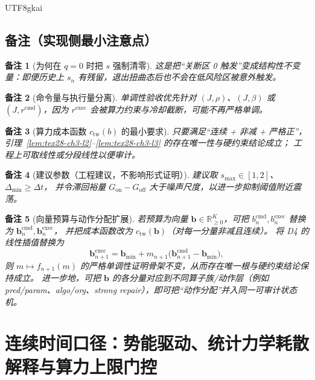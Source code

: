 \documentclass[12pt]{article}
\newtheorem{remark}{备注}[section]
\newcommand{\RR}{\mathbb{R}}
\begin{document}
\begin{CJK*}{UTF8}{gkai}
\subsection{备注（实现侧最小注意点）}
\label{subsec:tex28-ch3-remarks}

\begin{remark}[为何在 $q=0$ 时把 $s$ 强制清零]
这是把“关断区 0 触发”变成结构性不变量：即便历史上 $s_n$ 有残留，退出扭曲态后也不会在低风险区被意外触发。
\end{remark}

\begin{remark}[命令量与执行量分离]
单调性验收优先针对 $(J,\rho)$、$(J,\beta)$ 或 $(J,r^{\mathrm{cmd}})$，因为 $r^{\mathrm{exec}}$ 会被算力约束与冷却截断，可能不再严格单调。
\end{remark}

\begin{remark}[算力成本函数 $c_{\mathrm{tw}}(b)$ 的最小要求]
只要满足“连续 + 非减 + 严格正”，引理~\ref{lem:tex28-ch3-l2}--\ref{lem:tex28-ch3-l3} 的存在唯一性与硬约束结论成立；
工程上可取线性或分段线性以便审计。
\end{remark}

\begin{remark}[建议参数（工程建议，不影响形式证明）]
建议取 $s_{\max}\in[1,2]$、$\Delta_{\min}\ge\Delta t$，
并令滞回裕量 $G_{\mathrm{on}}-G_{\mathrm{off}}$ 大于噪声尺度，以进一步抑制阈值附近震荡。
\end{remark}

\begin{remark}[向量预算与动作分配扩展]
若预算为向量 $\mathbf{b}\in\RR_{\ge 0}^{K}$，可把 $b^{\mathrm{cmd}}_n,b^{\mathrm{exec}}_n$ 替换为
$\mathbf{b}^{\mathrm{cmd}}_n,\mathbf{b}^{\mathrm{exec}}_n$，
并把成本函数改为 $c_{\mathrm{tw}}(\mathbf{b})$（对每一分量非减且连续）。
将 D4 的线性插值替换为
\[
  \mathbf{b}^{\mathrm{exec}}_{n+1}=\mathbf{b}_{\min}+m_{n+1}\bigl(\mathbf{b}^{\mathrm{cmd}}_{n+1}-\mathbf{b}_{\min}\bigr)
    ,
\]
则 $m\mapsto f_{n+1}(m)$ 的严格单调性证明骨架不变，从而存在唯一根与硬约束结论保持成立。
进一步地，可把 $\mathbf{b}$ 的各分量对应到不同算子族/动作层（例如 pred/param、algo/org、strong repair），即可把“动作分配”并入同一可审计状态机。
\end{remark}

\clearpage

\section{连续时间口径：势能驱动、统计力学耗散解释与算力上限门控}
\label{sec:tex28-ch4}


\end{CJK*}
\end{document}
